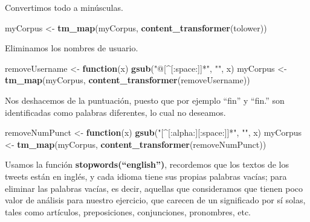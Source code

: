 \documentclass[]{article}
\newenvironment{Shaded}{\begin{snugshade}}{\end{snugshade}}
\newcommand{\ControlFlowTok}[1]{\textcolor[rgb]{0.13,0.29,0.53}{\textbf{#1}}}
\newcommand{\KeywordTok}[1]{\textcolor[rgb]{0.13,0.29,0.53}{\textbf{#1}}}
\newcommand{\NormalTok}[1]{#1}
\newcommand{\StringTok}[1]{\textcolor[rgb]{0.31,0.60,0.02}{#1}}
\begin{document}
Convertimos todo a minúsculas.

\begin{Shaded}
\begin{Highlighting}[]
\NormalTok{myCorpus <-}\StringTok{ }\KeywordTok{tm_map}\NormalTok{(myCorpus, }\KeywordTok{content_transformer}\NormalTok{(tolower))}
\end{Highlighting}
\end{Shaded}

Eliminamos los nombres de usuario.

\begin{Shaded}
\begin{Highlighting}[]
\NormalTok{removeUsername <-}\StringTok{ }\ControlFlowTok{function}\NormalTok{(x) }\KeywordTok{gsub}\NormalTok{(}\StringTok{"@[^[:space:]]*"}\NormalTok{, }\StringTok{""}\NormalTok{, x)  }
\NormalTok{myCorpus <-}\StringTok{ }\KeywordTok{tm_map}\NormalTok{(myCorpus, }\KeywordTok{content_transformer}\NormalTok{(removeUsername))}
\end{Highlighting}
\end{Shaded}

Nos deshacemos de la puntuación, puesto que por ejemplo ``fin'' y
``fin.'' son identificadas como palabras diferentes, lo cual no
deseamos.

\begin{Shaded}
\begin{Highlighting}[]
\NormalTok{removeNumPunct <-}\StringTok{ }\ControlFlowTok{function}\NormalTok{(x) }\KeywordTok{gsub}\NormalTok{(}\StringTok{"[^[:alpha:][:space:]]*"}\NormalTok{, }\StringTok{""}\NormalTok{, x)   }
\NormalTok{myCorpus <-}\StringTok{ }\KeywordTok{tm_map}\NormalTok{(myCorpus, }\KeywordTok{content_transformer}\NormalTok{(removeNumPunct))}
\end{Highlighting}
\end{Shaded}

Usamos la función \textbf{stopwords(``english'')},
recordemos que los textos de los tweets están en inglés, y cada idioma
tiene sus propias palabras vacías; para eliminar las palabras vacías, es
decir, aquellas que consideramos que tienen poco valor de análisis para nuestro ejercicio, que carecen de un
significado por sí solas, tales como artículos, preposiciones,
conjunciones, pronombres, etc.
\end{document}
